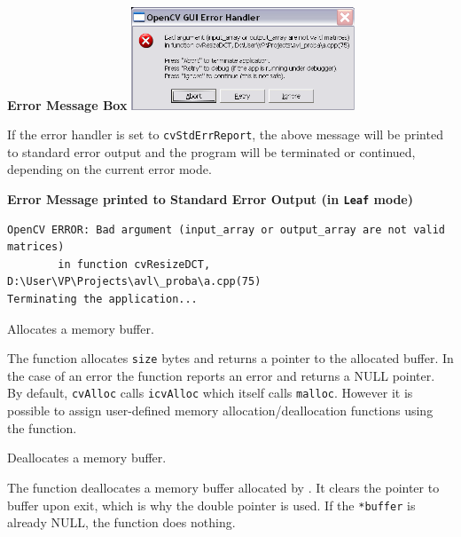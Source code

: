 \textbf{Error Message Box}
\includegraphics[width=0.5\textwidth]{pics/errmsg.png}

If the error handler is set to \texttt{cvStdErrReport}, the above message will be printed to standard error output and the program will be terminated or continued, depending on the current error mode.

\textbf{Error Message printed to Standard Error Output (in \texttt{Leaf} mode)}

\begin{verbatim}
OpenCV ERROR: Bad argument (input_array or output_array are not valid matrices)
        in function cvResizeDCT, D:\User\VP\Projects\avl\_proba\a.cpp(75)
Terminating the application...
\end{verbatim}

Allocates a memory buffer.


\begin{description}
\end{description}

The function allocates \texttt{size} bytes and returns
a pointer to the allocated buffer. In the case of an error the function reports an
error and returns a NULL pointer. By default, \texttt{cvAlloc} calls
\texttt{icvAlloc} which
itself calls \texttt{malloc}. However it is possible to assign user-defined memory
allocation/deallocation functions using the  function.

Deallocates a memory buffer.


\begin{description}
\end{description}

The function deallocates a memory buffer allocated by
. It clears the pointer to buffer upon exit, which is why
the double pointer is used. If the \texttt{*buffer} is already NULL, the function
does nothing.

